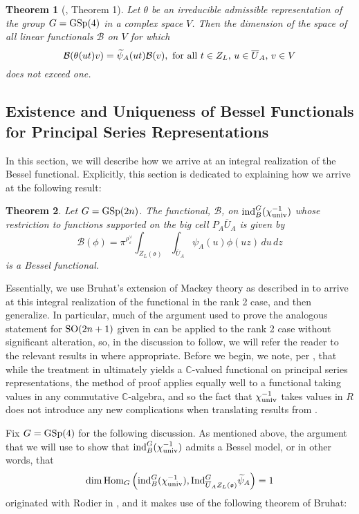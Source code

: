 \documentclass[11pt,letterpaper]{article}
\newcommand{\C}{\mathbb{C}}
\newcommand{\calB}{\mathcal{B}}
\newcommand{\ve}{\varepsilon}
\newcommand{\goth}{\mathfrak}
\newcommand{\SO}{\textup{SO}}
\newcommand{\GSp}{\textup{GSp}}
\newcommand{\calHom}{\textup{Hom}}
\newcommand{\Ind}{\textup{Ind}}
\newcommand{\ind}{\textup{ind}}
\newtheorem{Theorem}{Theorem}[section]
\theoremstyle{remark}
\numberwithin{equation}{section}
\begin{document}
\begin{Theorem}[\cite{NPS}, Theorem 1]\label{thm:uniqueness}
Let $\theta$ be an irreducible admissible representation of the group $G = \GSp(4)$ in a complex space $V$. Then the dimension of the space of all linear functionals $\calB$ on $V$ for which $$\calB(\theta(ut) v) = \widetilde{\psi}_A(ut)\calB(v), \textup{ for all $t \in Z_L$, $u \in \overline{U}_A$, $v \in V$}$$ does not exceed one. 
\end{Theorem}

\subsection{Existence and Uniqueness of Bessel Functionals for Principal Series Representations}\label{sec:mackey}

In this section, we will describe how we arrive at an integral realization of the Bessel functional. Explicitly, this section is dedicated to explaining how we arrive at the following result: 

\begin{Theorem}\label{thm:functional}
Let $G = \GSp(2n)$. The functional, $\calB$, on $\ind_B^G(\chi_{\textup{univ}}^{-1})$ whose restriction to functions supported on the big cell $P_A\overline{U}_A$ is given by $$\calB(\phi) = \pi^{\rho_{\ve}^{\vee}} \int_{Z_L(\goth{o})}\int_{\overline{U}_A} \psi_A(u)\phi(uz)\,du\,dz$$ is a Bessel functional.
\end{Theorem}

Essentially, we use Bruhat's extension of Mackey theory as described in \cite{Rod} to arrive at this integral realization of the functional in the rank 2 case, and then generalize. In particular, much of the argument used to prove the analogous statement for $\SO(2n+1)$ given in \cite{FG} can be applied to the rank 2 case without significant alteration, so, in the discussion to follow, we will refer the reader to the relevant results in \cite{FG} where appropriate. Before we begin, we note, per \cite{HKP}, that while the treatment in \cite{FG} ultimately yields a $\C$-valued functional on principal series representations, the method of proof applies equally well to a functional taking values in any commutative $\C$-algebra, and so the fact that $\chi_{\textup{univ}}^{-1}$ takes values in $R$ does not introduce any new complications when translating results from \cite{FG}.

Fix $G = \GSp(4)$ for the following discussion. As mentioned above, the argument that we will use to show that $\ind_B^G (\chi_{\textup{univ}}^{-1})$ admits a Bessel model, or in other words, that $$\dim \calHom_G\left(\ind_B^G(\chi_{\textup{univ}}^{-1}), \Ind_{\overline{U}_AZ_L(\goth{o})}^G \widetilde{\psi}_A\right) = 1$$
originated with Rodier in \cite{Rod}, and it makes use of the following theorem of Bruhat:
\end{document}
